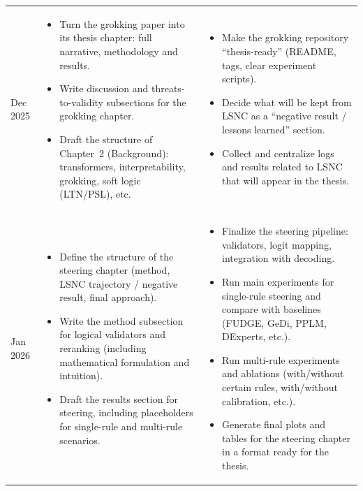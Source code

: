 \documentclass[../../infufrgs/ppgc-prop-tese.tex]{subfiles}
\begin{document}
\begin{longtable}{p{}p{}p{}}
Dec 2025 &
\begin{itemize}
  \item Turn the grokking paper into its thesis chapter: full narrative, methodology and results.
  \item Write discussion and threats-to-validity subsections for the grokking chapter.
  \item Draft the structure of Chapter~2 (Background): transformers, interpretability, grokking, soft logic (LTN/PSL), etc.
\end{itemize}
&
\begin{itemize}
  \item Make the grokking repository “thesis-ready” (README, tags, clear experiment scripts).
  \item Decide what will be kept from LSNC as a “negative result / lessons learned” section.
  \item Collect and centralize logs and results related to LSNC that will appear in the thesis.
\end{itemize}
\\

Jan 2026 &
\begin{itemize}
  \item Define the structure of the steering chapter (method, LSNC trajectory / negative result, final approach).
  \item Write the method subsection for logical validators and reranking (including mathematical formulation and intuition).
  \item Draft the results section for steering, including placeholders for single-rule and multi-rule scenarios.
\end{itemize}
&
\begin{itemize}
  \item Finalize the steering pipeline: validators, logit mapping, integration with decoding.
  \item Run main experiments for single-rule steering and compare with baselines (FUDGE, GeDi, PPLM, DExperts, etc.).
  \item Run multi-rule experiments and ablations (with/without certain rules, with/without calibration, etc.).
  \item Generate final plots and tables for the steering chapter in a format ready for the thesis.
\end{itemize}
\\


\end{longtable}
\end{document}
